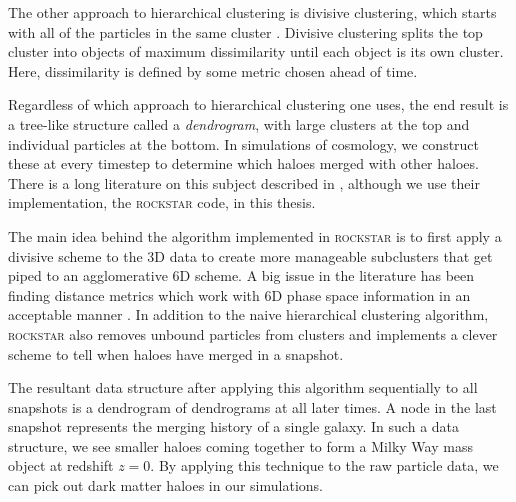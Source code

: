The other approach to hierarchical clustering is divisive clustering, which starts with all of the particles in the same cluster \citep{statistical_learning_r}. Divisive clustering splits the top cluster into objects of maximum dissimilarity until each object is its own cluster. Here, dissimilarity is defined by some metric chosen ahead of time. 

Regardless of which approach to hierarchical clustering one uses, the end result is a tree-like structure called a \textit{dendrogram}, with large clusters at the top and individual particles at the bottom. In simulations of cosmology, we construct these at every timestep to determine which haloes merged with other haloes. There is a long literature on this subject described in \citet{rockstar}, although we use their implementation, the \textsc{rockstar} code, in this thesis.

The main idea behind the algorithm implemented in \textsc{rockstar} is to first apply a divisive scheme to the 3D data to create more manageable subclusters that get piped to an agglomerative 6D scheme. A big issue in the literature has been finding distance metrics which work with 6D phase space information in an acceptable manner \citep{rockstar}. In addition to the naive hierarchical clustering algorithm, \textsc{rockstar} also removes unbound particles from clusters and implements a clever scheme to tell when haloes have merged in a snapshot. 

The resultant data structure after applying this algorithm sequentially to all snapshots is  a dendrogram of dendrograms at all later times. A node in the last snapshot represents the merging history of a single galaxy. In such a data structure, we see smaller haloes coming together to form a Milky Way mass object at redshift $z=0$. By applying this technique to the raw particle data, we can pick out dark matter haloes in our simulations.




